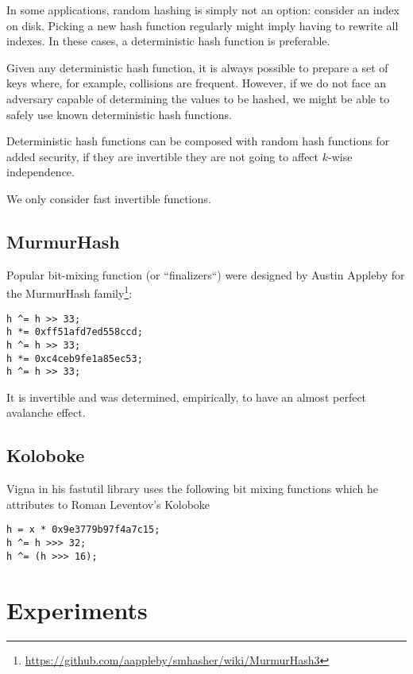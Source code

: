 \documentclass{article}
\begin{document}
In some applications, random hashing is simply not an option: consider an index on disk. Picking a new hash function regularly might imply having to rewrite all indexes.
In these cases, a deterministic hash function is preferable.

Given any deterministic hash function, it is always possible to prepare a set of keys where, for example, collisions are frequent. However, if we do not face an adversary capable of determining the values to be hashed, we might be able to  safely use known deterministic hash functions. 

Deterministic hash functions can be composed with random hash functions for added security, if they are invertible they are not going to affect $k$-wise independence.


We only consider fast invertible functions.


\subsection{MurmurHash}

Popular bit-mixing function (or ``finalizers``) were designed by Austin	Appleby for the MurmurHash family\footnote{\url{https://github.com/aappleby/smhasher/wiki/MurmurHash3}}:


\begin{lstlisting}
h ^= h >> 33;
h *= 0xff51afd7ed558ccd;
h ^= h >> 33;
h *= 0xc4ceb9fe1a85ec53;
h ^= h >> 33;
\end{lstlisting}

It is invertible and was determined, empirically, to have an almost perfect avalanche effect.

\subsection{Koloboke}

Vigna in his fastutil library uses the following bit mixing functions which he attributes to  Roman Leventov's Koloboke


\begin{lstlisting}
h = x * 0x9e3779b97f4a7c15;
h ^= h >>> 32;
h ^= (h >>> 16);
\end{lstlisting}


\section{Experiments}
\end{document}

